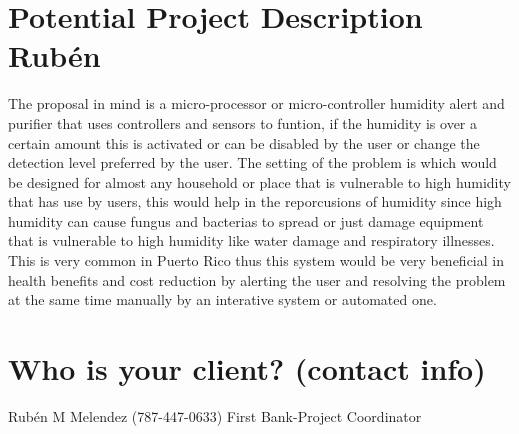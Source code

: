 \documentclass[12pt]{article}
\begin{document}
\section {Potential Project Description Rubén}
The proposal in mind is a micro-processor or micro-controller humidity alert and purifier that uses controllers and sensors to funtion, if the humidity is over a certain amount this is activated or can be disabled by the user or change the detection level preferred by the user. The setting of the problem is which would be designed for almost any household or place that is vulnerable to high humidity that has use by users, this would help in the reporcusions of humidity since high humidity can cause fungus and bacterias to spread or just damage equipment that is vulnerable to high humidity like water damage and respiratory illnesses. This is very common in Puerto Rico thus this system would be very beneficial in health benefits and cost reduction by alerting the user and resolving the problem at the same time manually by an interative system or automated one. 
\newpage
\section{Who is your client? (contact info)}
Rubén M Melendez (787-447-0633)
\newline
First Bank-Project Coordinator
\end{document}
